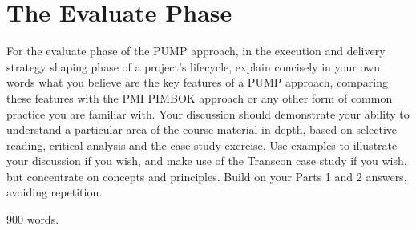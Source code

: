 \section{The Evaluate Phase} \label{s:Evaluate}

For the evaluate phase of the PUMP approach, in the execution and delivery strategy shaping phase of a project’s lifecycle, explain concisely in your own words what you believe are the key features of a PUMP approach, comparing these features with the PMI PIMBOK approach or any other form of common practice you are familiar with. Your discussion should demonstrate your ability to understand a particular area of the course material in depth, based on selective reading, critical analysis and the case study exercise. Use examples to illustrate your discussion if you wish, and make use of the Transcon case study if you wish, but concentrate on concepts and principles. Build on your Parts 1 and 2 answers, avoiding repetition.

900 words.

